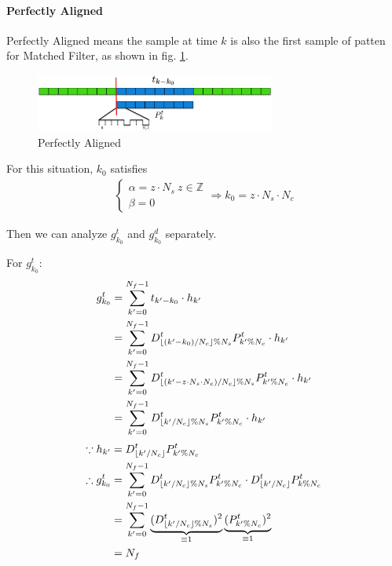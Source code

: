 \documentclass[a4paper]{report}
\DeclarePairedDelimiter\floor{\lfloor}{\rfloor}
\begin{document}
\paragraph{Perfectly Aligned} %
\label{par:perfectly_aligned}
Perfectly Aligned means the sample at time $k$ is also the first sample of patten for Matched Filter, as shown in fig. \ref{fig:Perfectly Aligned}.
\begin{figure}[ht]
	\centering
	\includegraphics[width=3.1in]{figure/perfectly_aligned.png}
	\caption{Perfectly Aligned}
	\label{fig:Perfectly Aligned}
\end{figure}
For this situation, $k_0$ satisfies 
\begin{align}
	\begin{cases}
		\alpha = z \cdot N_s ~ z \in \mathbb{Z}\\
		\beta = 0
	\end{cases}
	\Rightarrow
	k_0 = z \cdot N_s \cdot N_c
\end{align}

Then we can analyze $g^t_{k_0}$ and $g^d_{k_0}$ separately.

For $g^t_{k_0}$: \label{eq:perfectly aligned-training}
\begin{align}
	g^t_{k_0}
	&= \sum_{k' = 0}^{N_f-1} t_{k'-k_0} \cdot h_{k'}\\
	&= \sum_{k' = 0}^{N_f-1} D^t_{\floor{(k'-k_0) / N_c}\%N_s} P^t_{k' \% N_c} \cdot h_{k'}\\
	&= \sum_{k' = 0}^{N_f-1} D^t_{\floor{(k'-z \cdot N_s \cdot N_c) /N_c}\% N_s} P^t_{k' \% N_c} \cdot h_{k'}\\
	&= \sum_{k' = 0}^{N_f-1} D^t_{\floor{k'/N_c}\%N_s} P^t_{k' \% N_c} \cdot h_{k'}\\
\end{align}
\begin{align}
	\because 
	h_{k'} &= D^t_{\floor{k'/N_c}} P^t_{k' \% N_c}\\
	\therefore
	g^t_{k_0}
	&= \sum_{k' = 0}^{N_f-1} D^t_{\floor{k'/N_c}\%N_s} P^t_{k' \% N_c} \cdot D^t_{\floor{k'/N_c}} P^t_{k \% N_c} \\
	&= \sum_{k' = 0}^{N_f-1} \underbrace{(D^t_{\floor{k'/N_c}\%N_s})^2}_{\equiv 1} \underbrace{(P^t_{k' \% N_c})^2}_{\equiv1}\\
	&= N_f
\end{align}
\end{document}
